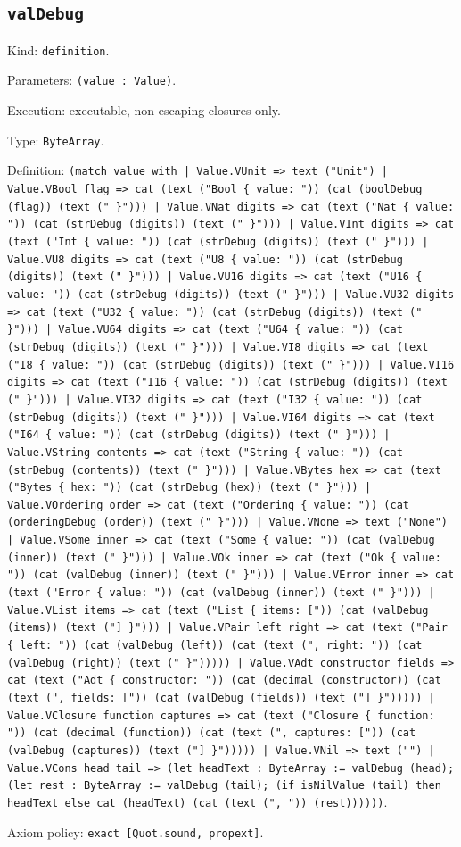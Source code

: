\documentclass[11pt]{article}
\begin{document}
\subsection*{\texttt{valDebug}}
\noindent Kind: \texttt{definition}.\par
\noindent Parameters: \texttt{(value : Value)}.\par
\noindent Execution: executable, non-escaping closures only.\par
\noindent Type: \texttt{ByteArray}.\par
\noindent Definition: \texttt{(match value with | Value.VUnit => text ("Unit") | Value.VBool flag => cat (text ("Bool \{ value: ")) (cat (boolDebug (flag)) (text (" \}"))) | Value.VNat digits => cat (text ("Nat \{ value: ")) (cat (strDebug (digits)) (text (" \}"))) | Value.VInt digits => cat (text ("Int \{ value: ")) (cat (strDebug (digits)) (text (" \}"))) | Value.VU8 digits => cat (text ("U8 \{ value: ")) (cat (strDebug (digits)) (text (" \}"))) | Value.VU16 digits => cat (text ("U16 \{ value: ")) (cat (strDebug (digits)) (text (" \}"))) | Value.VU32 digits => cat (text ("U32 \{ value: ")) (cat (strDebug (digits)) (text (" \}"))) | Value.VU64 digits => cat (text ("U64 \{ value: ")) (cat (strDebug (digits)) (text (" \}"))) | Value.VI8 digits => cat (text ("I8 \{ value: ")) (cat (strDebug (digits)) (text (" \}"))) | Value.VI16 digits => cat (text ("I16 \{ value: ")) (cat (strDebug (digits)) (text (" \}"))) | Value.VI32 digits => cat (text ("I32 \{ value: ")) (cat (strDebug (digits)) (text (" \}"))) | Value.VI64 digits => cat (text ("I64 \{ value: ")) (cat (strDebug (digits)) (text (" \}"))) | Value.VString contents => cat (text ("String \{ value: ")) (cat (strDebug (contents)) (text (" \}"))) | Value.VBytes hex => cat (text ("Bytes \{ hex: ")) (cat (strDebug (hex)) (text (" \}"))) | Value.VOrdering order => cat (text ("Ordering \{ value: ")) (cat (orderingDebug (order)) (text (" \}"))) | Value.VNone => text ("None") | Value.VSome inner => cat (text ("Some \{ value: ")) (cat (valDebug (inner)) (text (" \}"))) | Value.VOk inner => cat (text ("Ok \{ value: ")) (cat (valDebug (inner)) (text (" \}"))) | Value.VError inner => cat (text ("Error \{ value: ")) (cat (valDebug (inner)) (text (" \}"))) | Value.VList items => cat (text ("List \{ items: [")) (cat (valDebug (items)) (text ("] \}"))) | Value.VPair left right => cat (text ("Pair \{ left: ")) (cat (valDebug (left)) (cat (text (", right: ")) (cat (valDebug (right)) (text (" \}"))))) | Value.VAdt constructor fields => cat (text ("Adt \{ constructor: ")) (cat (decimal (constructor)) (cat (text (", fields: [")) (cat (valDebug (fields)) (text ("] \}"))))) | Value.VClosure function captures => cat (text ("Closure \{ function: ")) (cat (decimal (function)) (cat (text (", captures: [")) (cat (valDebug (captures)) (text ("] \}"))))) | Value.VNil => text ("") | Value.VCons head tail => (let headText : ByteArray := valDebug (head); (let rest : ByteArray := valDebug (tail); (if isNilValue (tail) then headText else cat (headText) (cat (text (", ")) (rest))))))}.\par
\noindent Axiom policy: \texttt{exact [Quot.sound, propext]}.\par
\end{document}
